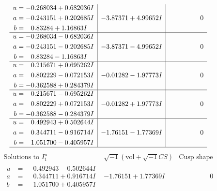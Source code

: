 \documentclass[1p]{elsarticle_modified}
\theoremstyle{definition}
\newcommand{\I}{\sqrt{-1}}
\begin{document}
$$\begin{array}{c|c|c}
\begin{aligned}
u &= -0.268034 + 0.682036 I \\
a &= -0.243151 + 0.202685 I \\
b &= \phantom{-}0.83284 + 1.16863 I\end{aligned}
 & -3.87371 + 4.99652 I & \phantom{-0.000000 } 0 \\ \hline\begin{aligned}
u &= -0.268034 - 0.682036 I \\
a &= -0.243151 - 0.202685 I \\
b &= \phantom{-}0.83284 - 1.16863 I\end{aligned}
 & -3.87371 - 4.99652 I & \phantom{-0.000000 } 0 \\ \hline\begin{aligned}
u &= \phantom{-}0.215671 + 0.695262 I \\
a &= \phantom{-}0.802229 - 0.072153 I \\
b &= -0.362588 + 0.284379 I\end{aligned}
 & -0.01282 - 1.97773 I & \phantom{-0.000000 } 0 \\ \hline\begin{aligned}
u &= \phantom{-}0.215671 - 0.695262 I \\
a &= \phantom{-}0.802229 + 0.072153 I \\
b &= -0.362588 - 0.284379 I\end{aligned}
 & -0.01282 + 1.97773 I & \phantom{-0.000000 } 0 \\ \hline\begin{aligned}
u &= \phantom{-}0.492943 + 0.502644 I \\
a &= \phantom{-}0.344711 - 0.916714 I \\
b &= \phantom{-}1.051700 - 0.405957 I\end{aligned}
 & -1.76151 - 1.77369 I & \phantom{-0.000000 } 0\\
 \hline 
 \end{array}$$\newpage$$\begin{array}{c|c|c}  
\text{Solutions to }I^u_{1}& \I (\text{vol} + \sqrt{-1}CS) & \text{Cusp shape}\\
 \hline 
\begin{aligned}
u &= \phantom{-}0.492943 - 0.502644 I \\
a &= \phantom{-}0.344711 + 0.916714 I \\
b &= \phantom{-}1.051700 + 0.405957 I\end{aligned}
 & -1.76151 + 1.77369 I & \phantom{-0.000000 } 0 \\ \hline\begin{aligned}

\end{aligned}
\end{array}$$
\end{document}
